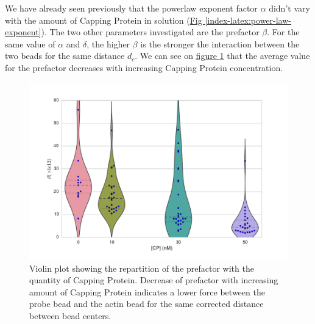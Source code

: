 \documentclass[A4paperpaper,11pt,english]{sphinxmanual}
\begin{document}
We have already seen previously that the powerlaw exponent factor \(\alpha\)
didn't vary with the amount of Capping Protein in solution (\hyperref[index-latex:power-law-exponent]{Fig  \ref*{index-latex:power-law-exponent}}).
The two other parameters investigated are the prefactor
\(\beta\). For the same value of \(\alpha\) and \(\delta\), the
higher \(\beta\) is the stronger the interaction between the two beads for
the same distance \(d_c\). We can see on \hyperref[index-latex:beta-violin]{figure  \ref*{index-latex:beta-violin}} that the
average value for the prefactor decreases with increasing Capping Protein
concentration.
\begin{figure}[htbp]
\centering
\capstart

\includegraphics[width=0.800\linewidth]{beta_violin.pdf}
\caption{Violin plot showing the repartition of the prefactor with the quantity of
Capping Protein. Decrease of prefactor with increasing amount of Capping
Protein indicates a lower force between the probe bead and the actin bead
for the same corrected distance between bead centers.}\label{index-latex:beta-violin}\end{figure}
\end{document}

